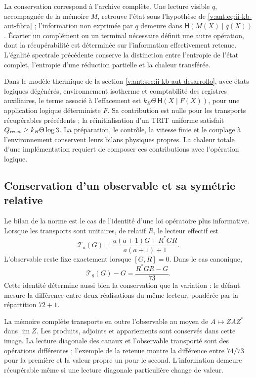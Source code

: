 La conservation correspond à l’archive complète. Une lecture visible
\(q\), accompagnée de la mémoire \(M\), retrouve l’état sous
l’hypothèse de \eqref{v:ant:eq:ii-kb-aut-fibra} ; l’information non
exprimée par \(q\) demeure dans
\(\mathsf H(M(X)\mid q(X))\). Écarter un complément ou un
terminal nécessaire définit une autre opération, dont la récupérabilité est
déterminée sur l’information effectivement retenue. L’égalité
spectrale précédente conserve la distinction entre l’entropie de l’état
complet, l’entropie d’une réduction partielle et la chaleur transférée.

Dans le modèle thermique de la section
\ref{v:ant:sec:ii-kb-aut-desarrollo}, avec états logiques dégénérés,
environnement isotherme et comptabilité des registres auxiliaires, le terme
associé à l’effacement est
\(k_B\Theta\,\mathsf H(X\mid F(X))\), pour une application logique
déterministe \(F\). Sa contribution est nulle pour les transports
récupérables précédents ; la réinitialisation d’un TRIT uniforme satisfait
\(Q_{\rm reset}\geq k_B\Theta\log3\). La préparation, le contrôle,
la vitesse finie et le couplage à l’environnement conservent leurs
bilans physiques propres. La chaleur totale d’une implémentation
requiert de composer ces contributions avec l’opération logique.

\subsection{Conservation d'un observable et sa symétrie relative}
\label{lib06:simetria}

Le bilan de la norme est le cas de l’identité d’une loi opératoire
plus informative. Lorsque les transports sont unitaires, de relatif
\(R\), le lecteur effectif est
\begin{equation}
 \mathcal T_a(G)=\frac{a(a+1)G+R^*GR}{a(a+1)+1}.
 \label{lib06:lector}
\end{equation}
L'observable reste fixe exactement lorsque \([G,R]=0\). Dans le cas canonique,
\begin{equation}
 \mathcal T_8(G)-G=\frac{R^*GR-G}{73}.
 \label{lib06:defecto-lector}
\end{equation}
Cette identité détermine aussi bien la conservation que la variation : le défaut mesure la différence entre deux réalisations du même lecteur, pondérée par la répartition \(72+1\).

La mémoire complète transporte en outre l’observable au moyen de
\(A\mapsto ZAZ^*\) dans \(\operatorname{im}Z\). Les produits,
adjoints et appariements sont conservés dans cette image. La lecture
diagonale des canaux et l’observable transporté sont des opérations
différentes ; l’exemple de la retenue montre la différence entre
\(74/73\) pour la première et la valeur propre un pour le second.
L’information demeure récupérable même si une lecture diagonale
particulière change de valeur.

